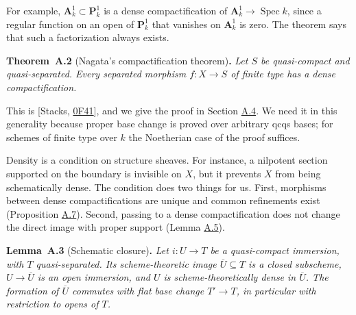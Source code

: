 \documentclass[11pt]{article}
\newenvironment{bpstatement}[2]{\par\addvspace{0.6\baselineskip}\noindent\textbf{#1}#2\textbf{.}\enspace\ignorespaces}
  {\par\addvspace{0.4\baselineskip}}
\newenvironment{bpstatementit}[2]{\begin{bpstatement}{#1}{#2}\itshape\ignorespaces}{\end{bpstatement}}
\begin{document}
\label{bp8}%
For example, \(\mathbf A^1_k\subset\mathbf P^1_k\) is a dense compactification of \(\mathbf A^1_k\to\operatorname{Spec}k\), since a regular function on an open of \(\mathbf P^1_k\) that vanishes on \(\mathbf A^1_k\) is zero. The theorem says that such a factorization always exists.

\label{bp9}%
\begin{bpstatementit}{Theorem~A.2}{ (Nagata's compactification theorem)}
Let \(S\) be quasi-compact and quasi-separated. Every separated morphism \(f:X\to S\) of finite type has a dense compactification.
\end{bpstatementit}

\label{bp10}%
This is [Stacks, \href{https://stacks.math.columbia.edu/tag/0F41}{0F41}], and we give the proof in Section \hyperref[bp65]{A.4}. We need it in this generality because proper base change is proved over arbitrary qcqs bases; for schemes of finite type over \(k\) the Noetherian case of the proof suffices.

Density is a condition on structure sheaves. For instance, a nilpotent section supported on the boundary is invisible on \(X\), but it prevents \(X\) from being schematically dense. The condition does two things for us. First, morphisms between dense compactifications are unique and common refinements exist (Proposition \hyperref[bp21]{A.7}). Second, passing to a dense compactification does not change the direct image with proper support (Lemma \hyperref[bp17]{A.5}).

\label{bp11}%
\begin{bpstatementit}{Lemma~A.3}{ (Schematic closure)}
Let \(i:U\to T\) be a quasi-compact immersion, with \(T\) quasi-separated. Its scheme-theoretic image \(\overline U\subseteq T\) is a closed subscheme, \(U\to\overline U\) is an open immersion, and \(U\) is scheme-theoretically dense in \(\overline U\). The formation of \(\overline U\) commutes with flat base change \(T'\to T\), in particular with restriction to opens of \(T\).
\end{bpstatementit}
\end{document}
